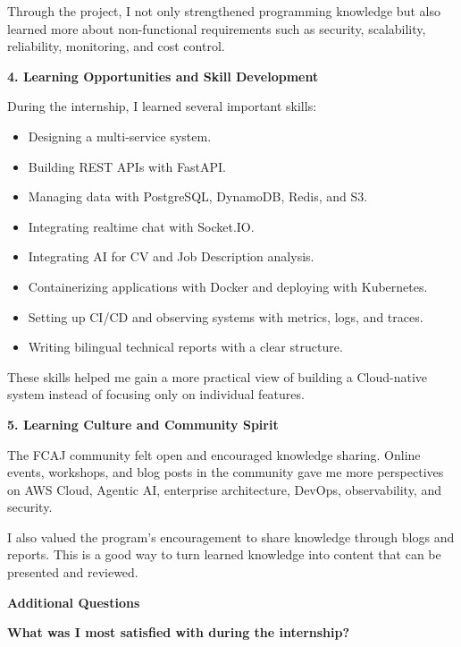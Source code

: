 Through the project, I not only strengthened programming knowledge but
also learned more about non-functional requirements such as security,
scalability, reliability, monitoring, and cost control.

\vspace{0.5em}\noindent\textbf{4. Learning Opportunities and Skill
Development}\par

During the internship, I learned several important skills:

\begin{itemize}
\tightlist
\item
  Designing a multi-service system.
\item
  Building REST APIs with FastAPI.
\item
  Managing data with PostgreSQL, DynamoDB, Redis, and S3.
\item
  Integrating realtime chat with Socket.IO.
\item
  Integrating AI for CV and Job Description analysis.
\item
  Containerizing applications with Docker and deploying with Kubernetes.
\item
  Setting up CI/CD and observing systems with metrics, logs, and traces.
\item
  Writing bilingual technical reports with a clear structure.
\end{itemize}

These skills helped me gain a more practical view of building a
Cloud-native system instead of focusing only on individual features.

\vspace{0.5em}\noindent\textbf{5. Learning Culture and Community
Spirit}\par

The FCAJ community felt open and encouraged knowledge sharing. Online
events, workshops, and blog posts in the community gave me more
perspectives on AWS Cloud, Agentic AI, enterprise architecture, DevOps,
observability, and security.

I also valued the program's encouragement to share knowledge through
blogs and reports. This is a good way to turn learned knowledge into
content that can be presented and reviewed.

\vspace{0.5em}\noindent\textbf{Additional Questions}\par

\vspace{0.5em}\noindent\textbf{What was I most satisfied with during the
internship?}\par

